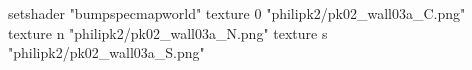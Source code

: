 setshader "bumpspecmapworld"
    texture 0 "philipk2/pk02_wall03a_C.png"
    texture n "philipk2/pk02_wall03a_N.png"
    texture s "philipk2/pk02_wall03a_S.png"